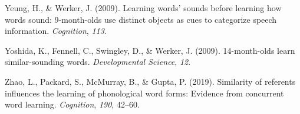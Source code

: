 \documentclass[english,,man]{apa6}
\begin{document}
\leavevmode\hypertarget{ref-yeung09}{}%
Yeung, H., \& Werker, J. (2009). Learning words' sounds before learning how words sound: 9-month-olds use distinct objects as cues to categorize speech information. \emph{Cognition}, \emph{113}.

\leavevmode\hypertarget{ref-yoshida2009}{}%
Yoshida, K., Fennell, C., Swingley, D., \& Werker, J. (2009). 14-month-olds learn similar-sounding words. \emph{Developmental Science}, \emph{12}.

\leavevmode\hypertarget{ref-Zhao2019}{}%
Zhao, L., Packard, S., McMurray, B., \& Gupta, P. (2019). Similarity of referents influences the learning of phonological word forms: Evidence from concurrent word learning. \emph{Cognition}, \emph{190}, 42--60.

\clearpage
\renewcommand{\listfigurename}{Figure captions}
\end{document}
